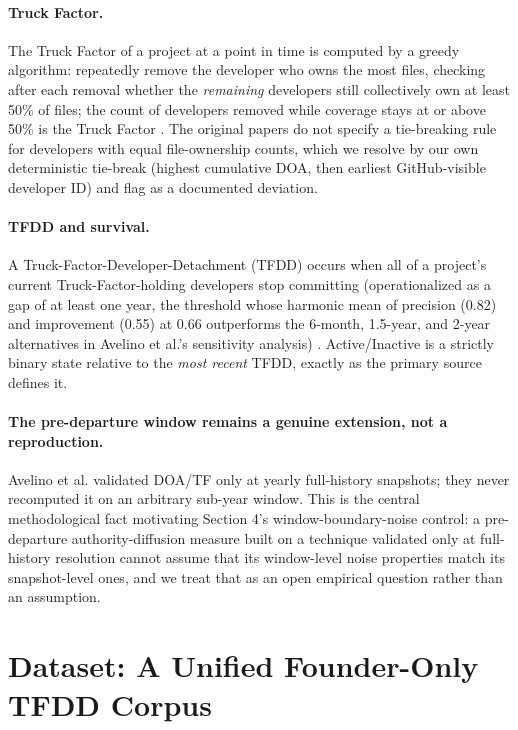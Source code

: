 \documentclass[11pt,letterpaper]{article}
\begin{document}
\paragraph{Truck Factor.} The Truck Factor of a project at a point in time is computed by a greedy algorithm: repeatedly remove the developer who owns the most files, checking after each removal whether the \emph{remaining} developers still collectively own at least 50\% of files; the count of developers removed while coverage stays at or above 50\% is the Truck Factor \citep{Avelino2016}. The original papers do not specify a tie-breaking rule for developers with equal file-ownership counts, which we resolve by our own deterministic tie-break (highest cumulative DOA, then earliest GitHub-visible developer ID) and flag as a documented deviation.

\paragraph{TFDD and survival.} A Truck-Factor-Developer-Detachment (TFDD) occurs when all of a project's current Truck-Factor-holding developers stop committing (operationalized as a gap of at least one year, the threshold whose harmonic mean of precision (0.82) and improvement (0.55) at 0.66 outperforms the 6-month, 1.5-year, and 2-year alternatives in Avelino et al.'s sensitivity analysis) \citep{Avelino2019}. Active/Inactive is a strictly binary state relative to the \emph{most recent} TFDD, exactly as the primary source defines it.

\paragraph{The pre-departure window remains a genuine extension, not a reproduction.} Avelino et al. validated DOA/TF only at yearly full-history snapshots; they never recomputed it on an arbitrary sub-year window. This is the central methodological fact motivating Section 4's window-boundary-noise control: a pre-departure authority-diffusion measure built on a technique validated only at full-history resolution cannot assume that its window-level noise properties match its snapshot-level ones, and we treat that as an open empirical question rather than an assumption.

\section{Dataset: A Unified Founder-Only TFDD Corpus}
\end{document}
